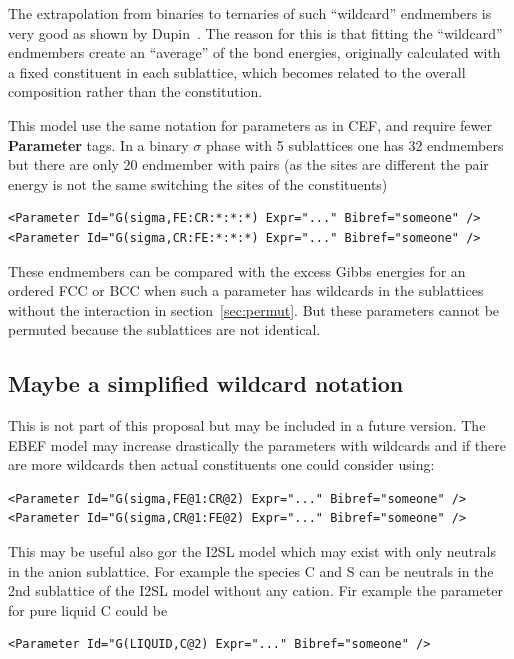\documentclass{article}
\begin{document}
\begin{appendices}
The extrapolation from binaries to ternaries of such ``wildcard''
endmembers is very good as shown by Dupin~\cite{18Dup}.  The reason
for this is that fitting the ``wildcard'' endmembers create an
``average'' of the bond energies, originally calculated with a fixed
constituent in each sublattice, which becomes related to the overall
composition rather than the constitution.

This model use the same notation for parameters as in CEF, and require
fewer {\bf Parameter} tags.  In a binary $\sigma$ phase with 5
sublattices one has 32 endmembers but there are only 20 endmember with
pairs (as the sites are different the pair energy is not the same
switching the sites of the constituents)

\begin{verbatim}
<Parameter Id="G(sigma,FE:CR:*:*:*) Expr="..." Bibref="someone" />
<Parameter Id="G(sigma,CR:FE:*:*:*) Expr="..." Bibref="someone" />
\end{verbatim}

These endmembers can be compared with the excess Gibbs energies for an
ordered FCC or BCC when such a parameter has wildcards in the
sublattices without the interaction in section~\ref{sec:permut}.  But
these parameters cannot be permuted because the sublattices are not
identical.

\subsection{Maybe a simplified wildcard notation}\label{sec:useat}

This is not part of this proposal but may be included in a future
version.  The EBEF model may increase drastically the parameters with
wildcards and if there are more wildcards then actual constituents one
could consider using:

\begin{verbatim}
<Parameter Id="G(sigma,FE@1:CR@2) Expr="..." Bibref="someone" />
<Parameter Id="G(sigma,CR@1:FE@2) Expr="..." Bibref="someone" />
\end{verbatim}

This may be useful also gor the I2SL model which may exist with only
neutrals in the anion sublattice.  For example the species C and S can
be neutrals in the 2nd sublattice of the I2SL model without any cation.
Fir example the parameter for pure liquid C could be

\begin{verbatim}
<Parameter Id="G(LIQUID,C@2) Expr="..." Bibref="someone" />
\end{verbatim}


\end{appendices}
\end{document}
